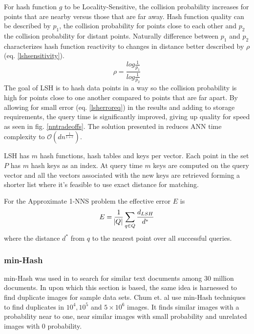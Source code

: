 \documentclass[english,12pt,a4paper,pdftex,elec,utf8, table]{aaltothesis}
\begin{document}
For hash function $g$ to be Locality-Sensitive, the collision probability increases for points that are nearby versus those that are far away. Hash function quality can be described by $p_1$, the collision probability for points close to each other and $p_2$ the collision probability for distant points.\cite{Andoni2015} Naturally difference between $p_1$ and $p_2$ characterizes hash function reactivity to changes in distance better described by $\rho$ (eq. \ref{lshsensitivity}).
\begin{equation}
  \label{lshsensitivity}
  \rho = \frac{log\frac{1}{p_1}}{log\frac{1}{p_2}}
  \end{equation}
The goal of LSH is to hash data points in a way so the collision probability is high for points close to one another compared to points that are far apart. By allowing for small error (eq. \ref{lsherroreq}) in the results and adding to storage requirements, the query time is significantly improved, giving up quality for speed as seen in fig. \ref{nntradeoffs}. \cite{Gionis1999} The solution presented in \cite{Gionis1999} reduces ANN time complexity to $\mathcal{O}(dn^{\frac{1}{1+\epsilon}})$.

LSH has $m$ hash functions, hash tables and keys per vector. Each point in the set $P$ has $m$ hash keys as an index. At query time $m$ keys are computed on the query vector and all the vectors associated with the new keys are retrieved forming a shorter list where it's feasible to use exact distance for matching.
\clearpage




For the Approximate 1-NNS problem the effective error $E$ is
\begin{equation}
  \label{lsherroreq}
E = \frac{1}{\abs{Q}}\sum_{q\in Q}\frac{d_{LSH}}{d^*}
  \end{equation}
where the distance $d^*$ from $q$ to the nearest point over all successful queries.

\subsubsection{min-Hash}
min-Hash was used in \cite{Broder1997} to search for similar text documents among 30 million documents. In \cite{Chum2008} upon which this section is based, the same idea is harnessed to find duplicate images for sample data sets. Chum et. al \cite{Chum2010} use min-Hash techniques to find duplicates in $10^4, 10^5$ and $5 \times 10^6$ images. It finds similar images with a probability near to one, near similar images with small probability and unrelated images with 0 probability.
\end{document}
